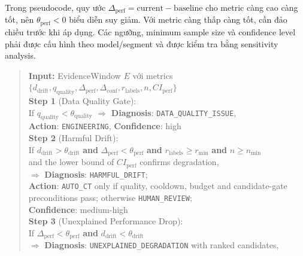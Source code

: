 \documentclass[11pt,a4paper]{article}
\begin{document}
Trong pseudocode, quy ước \(\Delta_\text{perf}=\text{current}-\text{baseline}\) cho metric càng cao càng tốt, nên \(\theta_\text{perf}<0\) biểu diễn suy giảm. Với metric càng thấp càng tốt, cần đảo chiều trước khi áp dụng. Các ngưỡng, minimum sample size và confidence level phải được cấu hình theo model/segment và được kiểm tra bằng sensitivity analysis.

\begin{quote}
\small
\textbf{Input:} EvidenceWindow $E$ với metrics $\{d_\text{drift}, q_\text{quality}, \Delta_\text{perf}, \Delta_\text{conf}, r_\text{labels}, n, CI_\text{perf}\}$\\[0.5em]
\textbf{Step 1} (Data Quality Gate):\\
  \hspace*{1em}If $q_\text{quality} < \theta_\text{quality}$ $\Rightarrow$ \textbf{Diagnosis}: \texttt{DATA\_QUALITY\_ISSUE},\\
  \hspace*{1em}\textbf{Action}: \texttt{ENGINEERING}, \textbf{Confidence}: high\\[0.3em]
\textbf{Step 2} (Harmful Drift):\\
\hspace*{1em}If $d_\text{drift} > \theta_\text{drift}$ \textbf{and} $\Delta_\text{perf} < \theta_\text{perf}$ \textbf{and} $r_\text{labels} \ge r_\text{min}$ \textbf{and} $n \ge n_\text{min}$\\
\hspace*{1em}and the lower bound of $CI_\text{perf}$ confirms degradation,\\
  \hspace*{1em}$\Rightarrow$ \textbf{Diagnosis}: \texttt{HARMFUL\_DRIFT};\\
  \hspace*{1em}\textbf{Action}: \texttt{AUTO\_CT} only if quality, cooldown, budget and candidate-gate preconditions pass; otherwise \texttt{HUMAN\_REVIEW};\\
  \hspace*{1em}\textbf{Confidence}: medium-high\\[0.3em]
\textbf{Step 3} (Unexplained Performance Drop):\\
\hspace*{1em}If $\Delta_\text{perf} < \theta_\text{perf}$ \textbf{and} $d_\text{drift} < \theta_\text{drift}$\\
  \hspace*{1em}$\Rightarrow$ \textbf{Diagnosis}: \texttt{UNEXPLAINED\_DEGRADATION} with ranked candidates,\\

\end{quote}
\end{document}
